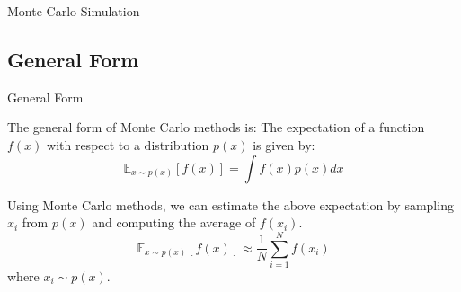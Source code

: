 \documentclass{beamer}
\begin{document}
\begin{section}{Monte Carlo Simulation}
    \subsection{General Form}

    \begin{frame}{General Form}

        The general form of Monte Carlo methods is:
        The expectation of a function $f(x)$ with respect to a distribution $p(x)$ is given by:
        \pause \begin{equation}
            \mathbb{E}_{x \sim p(x)}[f(x)] = \int f(x) p(x) dx
        \end{equation}
        
        \pause Using Monte Carlo methods, we can estimate the above expectation by sampling $x_i$ from $p(x)$ and computing the average of $f(x_i)$.
        \pause \begin{equation}
            \mathbb{E}_{x \sim p(x)}[f(x)] \approx \frac{1}{N} \sum_{i=1}^{N} f(x_i)
        \end{equation}
        where $x_i \sim p(x)$.

    \end{frame}


\end{section}
\end{document}
